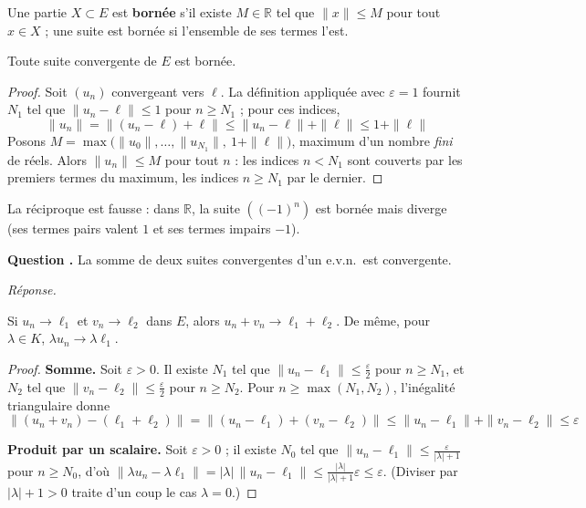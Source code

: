 \documentclass[11pt]{article}
\newcounter{qnum}
\newcommand{\question}[1]{%
\stepcounter{qnum}%
\bigskip
\noindent\textbf{Question \theqnum.} #1\par}
\newcommand{\reponse}{\noindent\textit{Réponse.}\ }
\begin{document}
Une partie $X\subset E$ est \textbf{bornée} s'il existe $M\in\mathbb{R}$ tel que $\|x\|\leq M$ pour tout $x\in X$ ; une suite est bornée si l'ensemble de ses termes l'est.

\begin{prop}
\label{prop:convergente-bornee}
Toute suite convergente de $E$ est bornée.
\end{prop}

\begin{proof}
Soit $(u_n)$ convergeant vers $\ell$. La définition appliquée avec $\varepsilon=1$ fournit $N_1$ tel que $\|u_n-\ell\|\leq 1$ pour $n\geq N_1$ ; pour ces indices,
\[\|u_n\|=\|(u_n-\ell)+\ell\|\leq\|u_n-\ell\|+\|\ell\|\leq 1+\|\ell\|\]
Posons $M=\max\big(\|u_0\|,\dots,\|u_{N_1}\|,\ 1+\|\ell\|\big)$, maximum d'un nombre \emph{fini} de réels. Alors $\|u_n\|\leq M$ pour tout $n$ : les indices $n<N_1$ sont couverts par les premiers termes du maximum, les indices $n\geq N_1$ par le dernier.
\end{proof}

\begin{remarque}
La réciproque est fausse : dans $\mathbb{R}$, la suite $((-1)^n)$ est bornée mais diverge (ses termes pairs valent $1$ et ses termes impairs $-1$).
\end{remarque}

\question{La somme de deux suites convergentes d'un e.v.n.\ est convergente.}
\reponse

\begin{prop}
\label{prop:somme-limites}
Si $u_n\to\ell_1$ et $v_n\to\ell_2$ dans $E$, alors $u_n+v_n\to\ell_1+\ell_2$. De même, pour $\lambda\in K$, $\lambda u_n\to\lambda\ell_1$.
\end{prop}

\begin{proof}
\textbf{Somme.} Soit $\varepsilon>0$. Il existe $N_1$ tel que $\|u_n-\ell_1\|\leq\frac\varepsilon2$ pour $n\geq N_1$, et $N_2$ tel que $\|v_n-\ell_2\|\leq\frac\varepsilon2$ pour $n\geq N_2$. Pour $n\geq\max(N_1,N_2)$, l'inégalité triangulaire donne
\[\big\|(u_n+v_n)-(\ell_1+\ell_2)\big\|=\big\|(u_n-\ell_1)+(v_n-\ell_2)\big\|\leq\|u_n-\ell_1\|+\|v_n-\ell_2\|\leq\varepsilon\]

\textbf{Produit par un scalaire.} Soit $\varepsilon>0$ ; il existe $N_0$ tel que $\|u_n-\ell_1\|\leq\frac{\varepsilon}{|\lambda|+1}$ pour $n\geq N_0$, d'où $\|\lambda u_n-\lambda\ell_1\|=|\lambda|\,\|u_n-\ell_1\|\leq\frac{|\lambda|}{|\lambda|+1}\varepsilon\leq\varepsilon$. (Diviser par $|\lambda|+1>0$ traite d'un coup le cas $\lambda=0$.)
\end{proof}
\end{document}
